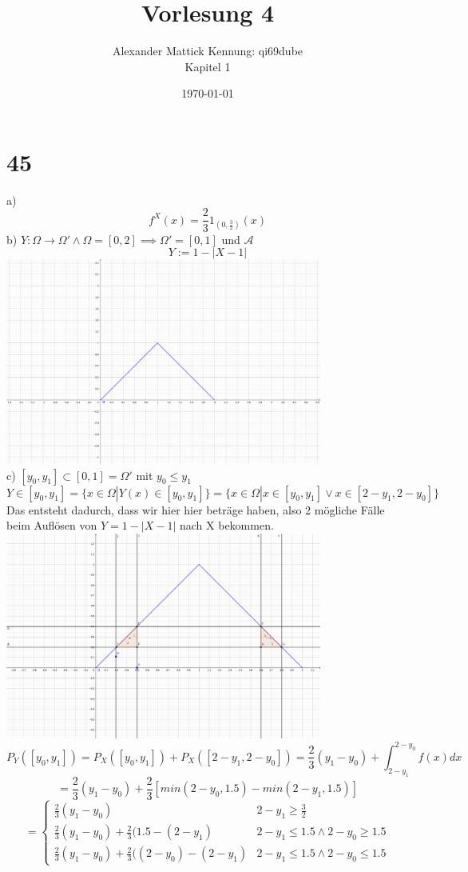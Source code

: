 \documentclass{article}
\author{
Alexander Mattick Kennung: qi69dube\\
Kapitel 1
}
\date{\today}
\title{Vorlesung 4}
\begin{document}
	\maketitle
	\section{45}
	a)
	\[f^X(x) = \frac{2}{3}1_{(0,\frac{3}{2})}(x)\]
	b)
	$Y:\Omega\to\Omega'\land \Omega =[0,2]\implies \Omega'=[0,1]$ und $\mathcal{A}$
	\[Y:=1-|X-1|\]
	\includegraphics[height=256px]{skizze.png}\\
	c) $[y_0,y_1]\subset [0,1]=\Omega'$ mit $y_0\leq y_1$\\
	\[Y\in[y_0,y_1] = \{x\in\Omega|Y(x)\in[y_0,y_1]\} = \{x\in\Omega| x\in[y_0,y_1]\lor x\in[2-y_1,2-y_0]\}\]
	Das entsteht dadurch, dass wir hier hier beträge haben, also 2 mögliche Fälle beim Auflösen von $Y=1-|X-1|$ nach X bekommen.\\
	\includegraphics[height=256px]{skizzeIntervalle.png}
	\[P_Y([y_0,y_1]) =P_X([y_0,y_1])+P_X([2-y_1,2-y_0]) = \frac{2}{3} (y_1-y_0)+\int^{2-y_0}_{2-y_1}f(x) dx\]
	\[= \frac{2}{3} (y_1-y_0)+\frac{2}{3}[min(2-y_0,1.5)-min(2-y_1,1.5)]\]
	\[=\begin{cases}\frac{2}{3} (y_1-y_0)& 2-y_1\geq \frac{3}{2}\\
	\frac{2}{3} (y_1-y_0)+\frac{2}{3}(1.5-(2-y_1)& 2-y_1\leq 1.5 \land 2-y_0\geq 1.5\\
	\frac{2}{3} (y_1-y_0)+\frac{2}{3}((2-y_0)-(2-y_1)& 2-y_1\leq 1.5 \land 2-y_0\leq 1.5
	\end{cases}\]
\end{document}

